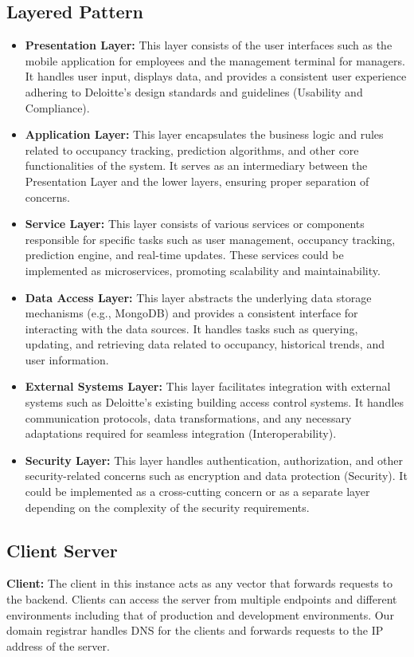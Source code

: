 \documentclass[11pt,a4paper]{article}
\begin{document}
\subsection*{Layered Pattern}
\begin{itemize}
    \item \textbf{Presentation Layer:} This layer consists of the user interfaces such as the mobile application for employees and the management terminal for managers. It handles user input, displays data, and provides a consistent user experience adhering to Deloitte's design standards and guidelines (Usability and Compliance).
    \item \textbf{Application Layer:} This layer encapsulates the business logic and rules related to occupancy tracking, prediction algorithms, and other core functionalities of the system. It serves as an intermediary between the Presentation Layer and the lower layers, ensuring proper separation of concerns.
    \item \textbf{Service Layer:} This layer consists of various services or components responsible for specific tasks such as user management, occupancy tracking, prediction engine, and real-time updates. These services could be implemented as microservices, promoting scalability and maintainability.
    \item \textbf{Data Access Layer:} This layer abstracts the underlying data storage mechanisms (e.g., MongoDB) and provides a consistent interface for interacting with the data sources. It handles tasks such as querying, updating, and retrieving data related to occupancy, historical trends, and user information.
    \item \textbf{External Systems Layer:} This layer facilitates integration with external systems such as Deloitte's existing building access control systems. It handles communication protocols, data transformations, and any necessary adaptations required for seamless integration (Interoperability).
    \item \textbf{Security Layer:} This layer handles authentication, authorization, and other security-related concerns such as encryption and data protection (Security). It could be implemented as a cross-cutting concern or as a separate layer depending on the complexity of the security requirements.
\end{itemize}

\subsection*{Client Server}
\textbf{Client:} The client in this instance acts as any vector that forwards requests to the backend. Clients can access the server from multiple endpoints and different environments including that of production and development environments. Our domain registrar handles DNS for the clients and forwards requests to the IP address of the server.
\end{document}
